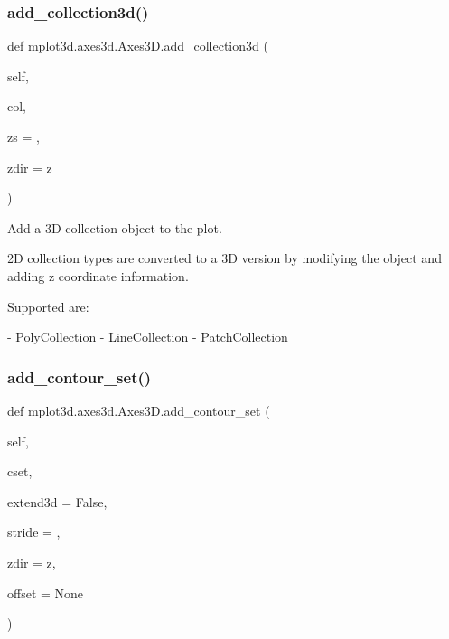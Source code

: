 \subsubsection{\texorpdfstring{add\+\_\+collection3d()}{add\_collection3d()}}
{\footnotesize\ttfamily def mplot3d.\+axes3d.\+Axes3\+D.\+add\+\_\+collection3d (\begin{DoxyParamCaption}\item[{}]{self,  }\item[{}]{col,  }\item[{}]{zs = {},  }\item[{}]{zdir = {\ttfamily \textquotesingle{}z\textquotesingle{}} }\end{DoxyParamCaption})}

\begin{DoxyVerb}Add a 3D collection object to the plot.

2D collection types are converted to a 3D version by
modifying the object and adding z coordinate information.

Supported are:

- PolyCollection
- LineCollection
- PatchCollection
\end{DoxyVerb}
 \mbox{\label{classmplot3d_1_1axes3d_1_1Axes3D_a916a7e79476cb4755550ea65dfda6e79}} 
\subsubsection{\texorpdfstring{add\+\_\+contour\+\_\+set()}{add\_contour\_set()}}
{\footnotesize\ttfamily def mplot3d.\+axes3d.\+Axes3\+D.\+add\+\_\+contour\+\_\+set (\begin{DoxyParamCaption}\item[{}]{self,  }\item[{}]{cset,  }\item[{}]{extend3d = {\ttfamily False},  }\item[{}]{stride = {},  }\item[{}]{zdir = {\ttfamily \textquotesingle{}z\textquotesingle{}},  }\item[{}]{offset = {\ttfamily None} }\end{DoxyParamCaption})}

